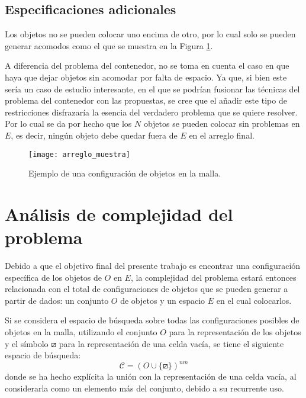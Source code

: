 \subsection{Especificaciones adicionales}
\label{subsec:especificaciones_adicionales}
%
%	
Los objetos no se pueden colocar uno encima de otro, por lo cual solo se pueden generar acomodos como el que se muestra en la Figura \ref{fig:muestra_acomodo}.
	
A diferencia del problema del contenedor, no se toma en cuenta el caso en que haya que dejar objetos sin acomodar por falta de espacio.
Ya que, si bien este sería un caso de estudio interesante, en el que se podrían fusionar las técnicas del problema del contenedor con las propuestas, se cree que el añadir este tipo de restricciones disfrazaría la esencia del verdadero problema que se quiere resolver.
Por lo cual se da por hecho que los $N$ objetos se pueden colocar sin problemas en $E$, es decir, ningún objeto debe quedar fuera de $E$ en el arreglo final.
%
\begin{figure}[H]
	\texttt{[image: arreglo\_muestra]}%
	\caption{Ejemplo de una configuración de objetos en la malla.}%
	\label{fig:muestra_acomodo}%
\end{figure}
%
%
\section{Análisis de complejidad del problema}
\label{sec:analisis_complejidad}
%
%
Debido a que el objetivo final del presente trabajo es encontrar una configuración específica de los objetos de $O$ en $E$, la complejidad del problema estará entonces relacionada con el total de configuraciones de objetos que se pueden generar a partir de dados: un conjunto $O$ de objetos y un espacio $E$ en el cual colocarlos.  

Si se considera el espacio de búsqueda sobre todas las configuraciones posibles de objetos en la malla, utilizando el conjunto $O$ para la representación de los objetos y el símbolo $\boxslash$ para la representación de una celda vacía, se tiene el siguiente espacio de búsqueda:
%
\begin{equation}
	\label{eq:complejidad_1}
	\mathcal{C} = (O \cup \{ \boxslash \})^{nm}
\end{equation}
%
donde se ha hecho explícita la unión con la representación de una celda vacía, al considerarla como un elemento más del conjunto, debido a su recurrente uso.

